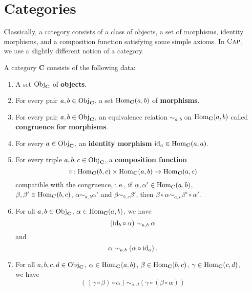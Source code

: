 \section{Categories}

Classically, a category consists of a class of objects, a set of morphisms, identity morphisms, and a composition function
satisfying some simple axioms. In $\textsc{Cap}$, we use a slightly different notion of a category.

\begin{definition}\label{definition:CapCategory}
 A \CapPkg category $\mathbf{C}$ consists of the following data:
 \begin{enumerate}
  \item A set $\mathrm{Obj}_{\mathbf{C}}$ of \textbf{objects}.
  \item For every pair $a,b \in \mathrm{Obj}_{\mathbf{C}}$, a set $\operatorname{\mathrm{Hom}}_{\mathbf{C}}( a, b )$ of \textbf{morphisms}.
  \item For every pair $a,b \in \mathrm{Obj}_{\mathbf{C}}$, an equivalence relation $\sim_{a,b}$ on $\operatorname{\mathrm{Hom}}_{\mathbf{C}}( a, b )$
  called \textbf{congruence for morphisms}.
  \item For every $a \in \mathrm{Obj}_{\mathbf{C}}$, an \textbf{identity morphism} $\mathrm{id}_a \in \operatorname{\mathrm{Hom}}_{\mathbf{C}}( a, a )$.
  \item For every triple $a, b, c \in \mathrm{Obj}_{\mathbf{C}}$, a \textbf{composition function}
  \[
   \circ: \operatorname{\mathrm{Hom}}_{\mathbf{C}}( b, c ) \times \operatorname{\mathrm{Hom}}_{\mathbf{C}}( a, b ) \rightarrow \operatorname{\mathrm{Hom}}_{\mathbf{C}}( a, c )
  \]
  compatible with the congruence, i.e., 
  if $\alpha, \alpha' \in \operatorname{\mathrm{Hom}}_{C}( a, b )$, 
  $\beta, \beta' \in \operatorname{\mathrm{Hom}}_{C}( b, c )$,
  $\alpha \sim_{a,b} \alpha'$ 
  and $\beta \sim_{b,c} \beta'$, 
  then $\beta \circ \alpha \sim_{a,c} \beta' \circ \alpha'$.
  \item For all $a, b \in \mathrm{Obj}_{\mathbf{C}}$, 
        $\alpha \in \operatorname{\mathrm{Hom}}_{\mathbf{C}}( a, b )$, 
        we have 
        \[
        \left( \mathrm{id}_{b} \circ \alpha \right) \sim_{a,b} \alpha
        \]
        and
        \[
        \alpha \sim_{a,b} \left( \alpha \circ \mathrm{id}_{a} \right).
        \]
  \item For all $a,b,c,d \in \mathrm{Obj}_{\mathbf{C}}$, 
        $\alpha \in \operatorname{\mathrm{Hom}}_{\mathbf{C}}( a, b )$, 
        $\beta \in \operatorname{\mathrm{Hom}}_{\mathbf{C}}( b, c )$, 
        $\gamma \in \operatorname{\mathrm{Hom}}_{\mathbf{C}}( c, d )$,
        we have
        \[
        \left(( \gamma \circ \beta ) \circ \alpha \right) \sim_{a,d} \left( \gamma \circ ( \beta \circ \alpha ) \right)
        \]
 \end{enumerate}
\end{definition}

